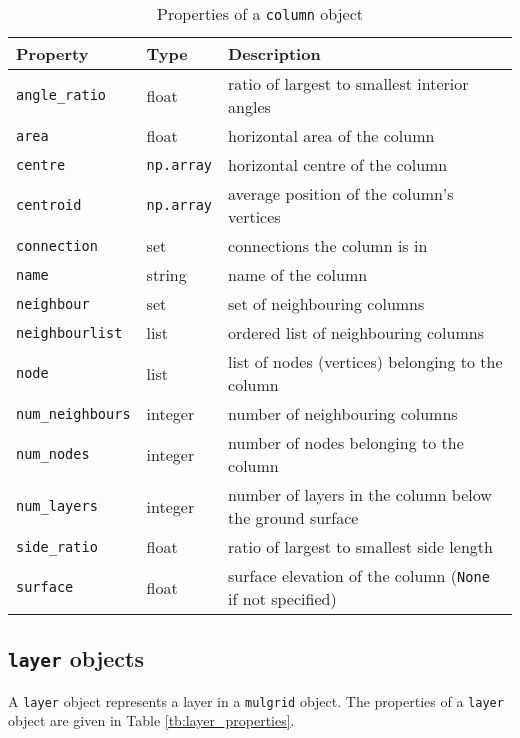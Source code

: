 \begin{table}
  \begin{center}
    \begin{tabular}{|l|l|l|}
      \hline
      \textbf{Property} & \textbf{Type} & \textbf{Description}\\
      \hline
      \texttt{angle\_ratio} & float & ratio of largest to smallest interior angles \\
      \texttt{area} & float & horizontal area of the column \\
      \texttt{centre} & \texttt{np.array} & horizontal centre of the column \\
      \texttt{centroid} & \texttt{np.array} & average position of the column's vertices \\
      \texttt{connection} & set & connections the column is in \\
      \texttt{name} & string & name of the column \\
      \texttt{neighbour} & set & set of neighbouring columns \\
      \texttt{neighbourlist} & list & ordered list of neighbouring columns \\
      \texttt{node} & list & list of nodes (vertices) belonging to the column \\
      \texttt{num\_neighbours} & integer & number of neighbouring columns \\
      \texttt{num\_nodes} & integer & number of nodes belonging to the column \\
      \texttt{num\_layers} & integer & number of layers in the column below the ground surface \\
      \texttt{side\_ratio} & float & ratio of largest to smallest side length \\
      \texttt{surface} & float & surface elevation of the column (\texttt{None} if not specified)\\
      \hline
    \end{tabular}
    \caption{Properties of a \texttt{column} object}
    \label{tb:column_properties}
  \end{center}
\end{table}

\subsection{\texttt{layer} objects}

A \texttt{layer} object represents a layer in a \texttt{mulgrid} object. The properties of a \texttt{layer} object are given in Table \ref{tb:layer_properties}.

